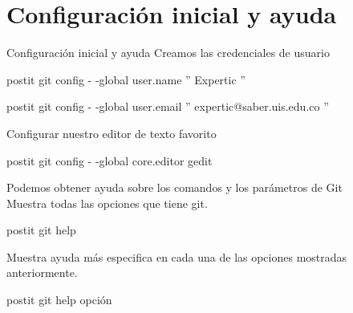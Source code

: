 \documentclass{beamer}
\begin{document}
\section{Configuración inicial y ayuda}
\begin{frame}{Configuración inicial y ayuda}
Creamos las credenciales de usuario \\
\begin{beamercolorbox}[sep=1mm]{postit}
git config - -global user.name '' Expertic ''
\end{beamercolorbox}
\begin{beamercolorbox}[sep=1mm]{postit}
git config - -global user.email '' expertic@saber.uis.edu.co ''
\end{beamercolorbox}
Configurar nuestro editor de texto favorito   \\
\begin{beamercolorbox}[sep=1mm]{postit}
git config - -global core.editor gedit
\end{beamercolorbox}

\vspace{5mm}
Podemos obtener ayuda sobre los comandos y los parámetros de Git \\
Muestra todas las opciones que tiene git.\\
\begin{beamercolorbox}[sep=1mm]{postit}
git help  
\end{beamercolorbox}
Muestra ayuda más especifica en cada una de las opciones mostradas anteriormente.\\
\begin{beamercolorbox}[sep=1mm]{postit}
git help opción 
\end{beamercolorbox}
\end{frame}
\end{document}
